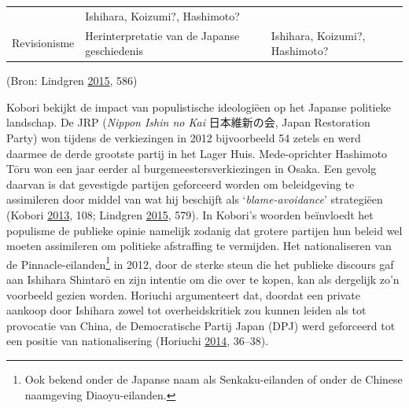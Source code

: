 \documentclass[10.5pt,dutch,]{article}
\begin{document}
\begin{longtable}[]{@{}lll@{}}
\begin{minipage}[t]{0.35\columnwidth}
\strut\end{minipage} &
\begin{minipage}[t]{0.35\columnwidth}\raggedright\strut
Ishihara, Koizumi?, Hashimoto?
\strut\end{minipage}\tabularnewline
\begin{minipage}[t]{0.21\columnwidth}\raggedright\strut
Revisionisme
\strut\end{minipage} &
\begin{minipage}[t]{0.35\columnwidth}\raggedright\strut
Herinterpretatie van de Japanse geschiedenis
\strut\end{minipage} &
\begin{minipage}[t]{0.35\columnwidth}\raggedright\strut
Ishihara, Koizumi?, Hashimoto?
\strut\end{minipage}\tabularnewline
\bottomrule
\end{longtable}

(Bron: Lindgren
\protect\hyperlink{ref-lindgrenux5fdevelopingux5f2015}{2015}, 586)

Kobori bekijkt de impact van populistische ideologiëen op het Japanse
politieke landschap. De JRP (\emph{Nippon Ishin no Kai} 日本維新の会,
Japan Restoration Party) won tijdens de verkiezingen in 2012
bijvoorbeeld 54 zetels en werd daarmee de derde grootste partij in het
Lager Huis. Mede-oprichter Hashimoto Tōru won een jaar eerder al
burgemeestersverkiezingen in Osaka. Een gevolg daarvan is dat gevestigde
partijen geforceerd worden om beleidgeving te assimileren door middel
van wat hij beschijft als `\emph{blame-avoidance}' strategiëen (Kobori
\protect\hyperlink{ref-koboriux5fpopulismux5f2013}{2013}, 108; Lindgren
\protect\hyperlink{ref-lindgrenux5fdevelopingux5f2015}{2015}, 579). In
Kobori's woorden beïnvloedt het populisme de publieke opinie namelijk
zodanig dat grotere partijen hun beleid wel moeten assimileren om
politieke afstraffing te vermijden. Het nationaliseren van de
Pinnacle-eilanden\footnote{Ook bekend onder de Japanse naam als
  Senkaku-eilanden of onder de Chinese naamgeving Diaoyu-eilanden.} in
2012, door de sterke steun die het publieke discours gaf aan Ishihara
Shintarō en zijn intentie om die over te kopen, kan als dergelijk zo'n
voorbeeld gezien worden. Horiuchi argumenteert dat, doordat een private
aankoop door Ishihara zowel tot overheidskritiek zou kunnen leiden als
tot provocatie van China, de Democratische Partij Japan (DPJ) werd
geforceerd tot een positie van nationalisering (Horiuchi
\protect\hyperlink{ref-horiuchiux5fpublicux5f2014}{2014}, 36--38).
\end{document}
